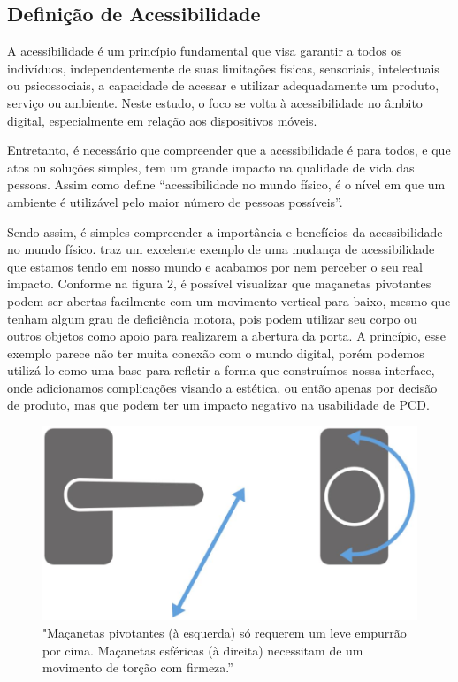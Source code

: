 \subsection{Definição de Acessibilidade}

A acessibilidade é um princípio fundamental que visa garantir a todos os indivíduos, independentemente de suas limitações físicas, sensoriais, intelectuais ou psicossociais, a capacidade de acessar e utilizar adequadamente um produto, serviço ou ambiente. Neste estudo, o foco se volta à acessibilidade no âmbito digital, especialmente em relação aos dispositivos móveis.

Entretanto, é necessário que compreender que a acessibilidade é para todos, e que atos ou soluções simples, tem um grande impacto na qualidade de vida das pessoas. Assim como define \cite{kalbag2017} “acessibilidade no mundo físico, é o nível em que um ambiente é utilizável pelo maior número de pessoas possíveis”.

Sendo assim, é simples compreender a importância e benefícios da acessibilidade no mundo físico. \cite{kalbag2017} traz um excelente exemplo de uma mudança de acessibilidade que estamos tendo em nosso mundo e acabamos por nem perceber o seu real impacto. Conforme na figura 2, é possível visualizar que maçanetas pivotantes podem ser abertas facilmente com um movimento vertical para baixo, mesmo que tenham algum grau de deficiência motora, pois podem utilizar seu corpo ou outros objetos como apoio para realizarem a abertura da porta. A princípio, esse exemplo parece não ter muita conexão com o mundo digital, porém podemos utilizá-lo como uma base para refletir a forma que construímos nossa interface, onde adicionamos complicações visando a estética, ou então apenas por decisão de produto, mas que podem ter um impacto negativo na usabilidade de PCD.

\begin{figure}[!h]
	\centering
	\caption{"Maçanetas pivotantes (à esquerda) só requerem um leve empurrão por cima. Maçanetas esféricas (à direita) necessitam de um movimento de torção com firmeza.”}
	\includegraphics[width=320pt]{Assets/Macanetas pivotantes.png}
\end{figure}

